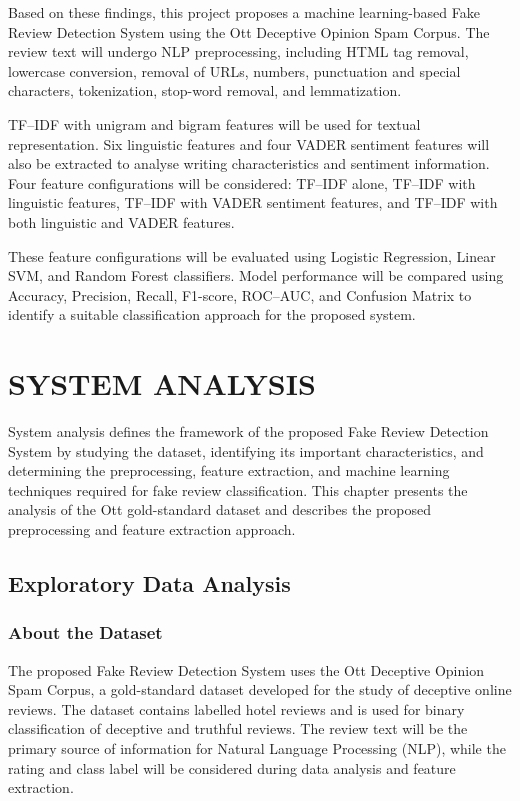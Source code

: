 \documentclass[12pt,a4paper]{report}
\begin{document}
Based on these findings, this project proposes a
machine learning-based Fake Review Detection System
using the Ott Deceptive Opinion Spam Corpus.
The review text will undergo NLP preprocessing,
including HTML tag removal, lowercase conversion,
removal of URLs, numbers, punctuation and special
characters, tokenization, stop-word removal,
and lemmatization.

TF--IDF with unigram and bigram features will be
used for textual representation. Six linguistic
features and four VADER sentiment features will
also be extracted to analyse writing characteristics
and sentiment information. Four feature configurations
will be considered: TF--IDF alone, TF--IDF with
linguistic features, TF--IDF with VADER sentiment
features, and TF--IDF with both linguistic and
VADER features.

These feature configurations will be evaluated
using Logistic Regression, Linear SVM, and Random
Forest classifiers. Model performance will be
compared using Accuracy, Precision, Recall,
F1-score, ROC--AUC, and Confusion Matrix to
identify a suitable classification approach
for the proposed system.

\newpage
\chapter{SYSTEM ANALYSIS}

System analysis defines the framework of the proposed Fake Review Detection System by studying the dataset, identifying its important characteristics, and determining the preprocessing, feature extraction, and machine learning techniques required for fake review classification. This chapter presents the analysis of the Ott gold-standard dataset and describes the proposed preprocessing and feature extraction approach.

\section{Exploratory Data Analysis}

\subsection{About the Dataset}

The proposed Fake Review Detection System uses the Ott Deceptive Opinion Spam Corpus, a gold-standard dataset developed for the study of deceptive online reviews. The dataset contains labelled hotel reviews and is used for binary classification of deceptive and truthful reviews. The review text will be the primary source of information for Natural Language Processing (NLP), while the rating and class label will be considered during data analysis and feature extraction.
\end{document}
